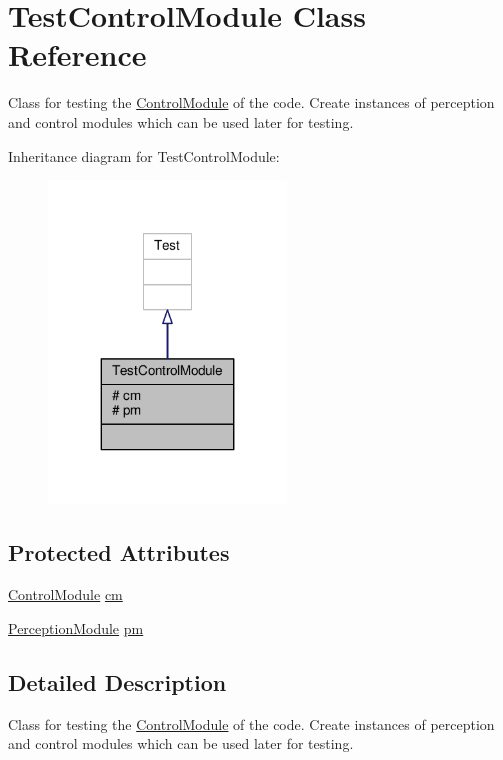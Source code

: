 \hypertarget{class_test_control_module}{}\section{Test\+Control\+Module Class Reference}
\label{class_test_control_module}


Class for testing the \hyperlink{class_control_module}{Control\+Module} of the code. Create instances of perception and control modules which can be used later for testing.  




Inheritance diagram for Test\+Control\+Module\+:\nopagebreak
\begin{figure}[H]
\begin{center}
\leavevmode
\includegraphics[width=179pt]{class_test_control_module__inherit__graph}
\end{center}
\end{figure}
\subsection*{Protected Attributes}
\begin{DoxyCompactItemize}
\item 
\hyperlink{class_control_module}{Control\+Module} \hyperlink{class_test_control_module_a8b31203bb99dac1486c80c5c270673a3}{cm}
\item 
\hyperlink{class_perception_module}{Perception\+Module} \hyperlink{class_test_control_module_ad498100deff15c962c1d6e933901f7cf}{pm}
\end{DoxyCompactItemize}


\subsection{Detailed Description}
Class for testing the \hyperlink{class_control_module}{Control\+Module} of the code. Create instances of perception and control modules which can be used later for testing. 


